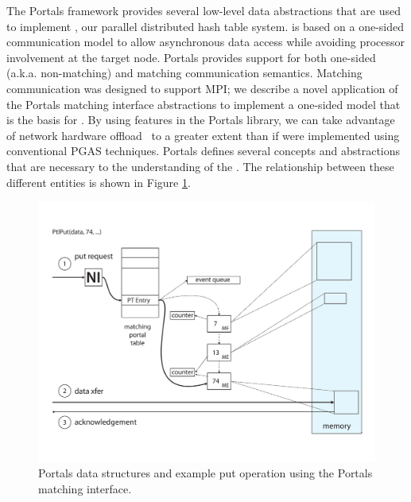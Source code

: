 

The Portals framework provides several low-level data abstractions that
are used to implement \pdht, our parallel distributed hash table system. \pdht is based on a one-sided
communication model to allow asynchronous data access while avoiding processor
involvement at the target node.  Portals provides support for both
one-sided (a.k.a. non-matching) and matching communication semantics.
Matching communication was designed to support MPI; we describe
a novel application of the Portals matching interface
abstractions to implement a one-sided model that is the basis for
\pdht. By using features in the Portals library,
we can take advantage of network hardware offload~\cite{brightwell:micro:06,bxi} to a greater extent
than if \pdht were implemented using conventional PGAS techniques. Portals defines several concepts
and abstractions that are necessary to the understanding of the
\pdht. The relationship between these different entities is shown in
Figure \ref{fig:portals_put}.

\begin{figure}[ht]
  \centering
  \includegraphics[width=\linewidth]{figs/portals_put}
  \caption{Portals data structures and example put operation using the Portals matching interface.}
  \label{fig:portals_put}
\end{figure}

